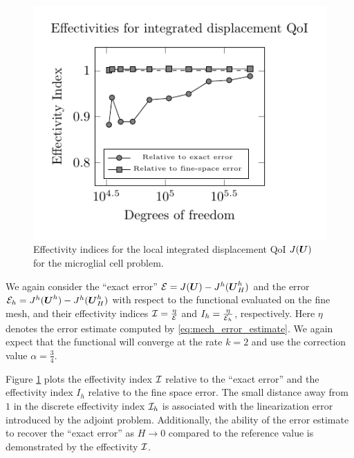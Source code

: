 \begin{figure}[ht!]
\centering
\includegraphics[width=.75\linewidth]{img/mech_glial_effectivity_plot.pdf}
\caption{Effectivity indices for the local integrated displacement QoI
$J(\boldsymbol{U})$ for the microglial cell problem.}
\label{fig:mech_glial_effectivity}
\end{figure}

We again consider the ``exact error'' $\mathcal{E} = J(\boldsymbol{U}) - J^h(\boldsymbol{U}^h_H)$ and
the error $\mathcal{E}_h = J^h(\boldsymbol{U}^h) - J^h(\boldsymbol{U}^h_H)$ with respect to the
functional evaluated on the fine mesh, and their effectivity indices
$\mathcal{I} = \frac{\eta}{\mathcal{E}}$ and $I_h = \frac{\eta}{\mathcal{E}_h}$, respectively. Here
$\eta$ denotes the error estimate computed by \eqref{eq:mech_error_estimate}.
We again expect that the functional will converge at the rate $k = 2$ and use
the correction value $\alpha = \frac34$.

Figure \ref{fig:mech_glial_effectivity} plots the effectivity index $\mathcal{I}$
relative to the ``exact error'' and the effectivity index $I_h$ relative to the
fine space error. The small distance away from $1$ in the discrete effectivity
index $\mathcal{I}_h$ is associated with the linearization error introduced by the
adjoint problem. Additionally, the ability of the error estimate to recover
the ``exact error'' as $H \to 0$ compared to the reference value is
demonstrated by the effectivity $\mathcal{I}$.

